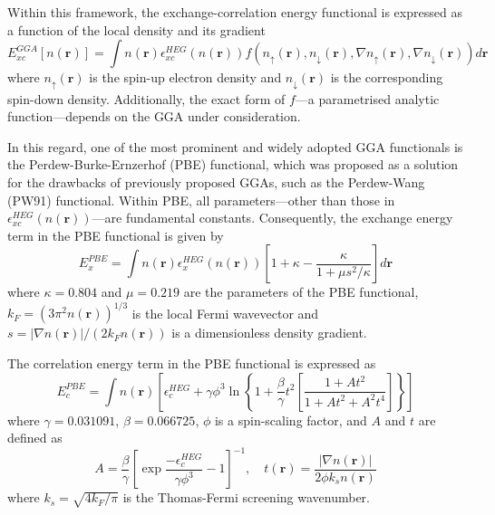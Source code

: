 Within this framework, the exchange-correlation energy functional is expressed as a function of the local density and its gradient 
\begin{equation}
  \label{eq62}
  E_{xc}^{GGA}[n(\mathbf{r})] = \int n(\mathbf{r}) \epsilon_{xc}^{HEG}(n(\mathbf{r})) f(n_{\uparrow}(\mathbf{r}), n_{\downarrow}(\mathbf{r}),\nabla n_{\uparrow}(\mathbf{r}), \nabla n_{\downarrow}(\mathbf{r})) d\mathbf{r}
\end{equation}
where $n_{\uparrow}(\mathbf{r})$ is the spin-up electron density and $n_{\downarrow}(\mathbf{r})$ is the corresponding spin-down density. Additionally, the exact form of $f$---a parametrised analytic function---depends on the GGA under consideration.  

In this regard, one of the most prominent and widely adopted GGA functionals is the Perdew-Burke-Ernzerhof (PBE)\supercite{Perdew1996} functional, which was proposed as a solution for the drawbacks of previously proposed GGAs, such as the Perdew-Wang (PW91) functional. Within PBE, all parameters---other than those in $\epsilon_{xc}^{HEG}(n(\mathbf{r}))$---are fundamental constants. Consequently, the exchange energy term in the PBE functional is given by 
\begin{equation}
  \label{eq63}
  E_{x}^{PBE} = \int n(\mathbf{r}) \epsilon_{x}^{HEG}(n(\mathbf{r})) \left[1 + \kappa - \frac{\kappa}{1 +  \mu s^2/\kappa}\right] d\mathbf{r}
\end{equation}
where $\kappa = 0.804$ and $\mu = 0.219$ are the parameters of the PBE functional, $k_F = (3\pi^2 n(\mathbf{r}))^{1/3}$ is the local Fermi wavevector and $s = |\nabla n(\mathbf{r})|/(2k_F n(\mathbf{r}))$ is a dimensionless density gradient.

The correlation energy term in the PBE functional is expressed as 
\begin{equation}
  \label{eq64}
  E_{c}^{PBE} = \int n(\mathbf{r}) \left[\epsilon_{c}^{HEG} + 
  \gamma \phi^3 \ln\left\{ 1 + \frac{\beta}{\gamma}t^2 
  \left[ 
  \frac{1 + At^2}{1 + At^2 + A^2t^4}
  \right]
  \right\} 
  \right]
\end{equation}
where $\gamma = 0.031091$, $\beta = 0.066725$, $\phi$ is a spin-scaling factor, and $A$ and $t$ are defined as 
\begin{equation}
  \label{eq65}
  A = \frac{\beta}{\gamma} \left[\exp{\frac{-\epsilon_{c}^{HEG}}{\gamma\phi^3}} - 1  \right]^{-1}, \quad 
  t(\mathbf{r}) = \frac{|\nabla n(\mathbf{r})|}{2\phi k_s n(\mathbf{r})}
\end{equation}
where $k_s = \sqrt{4 k_F / \pi}$ is the Thomas-Fermi screening wavenumber.

